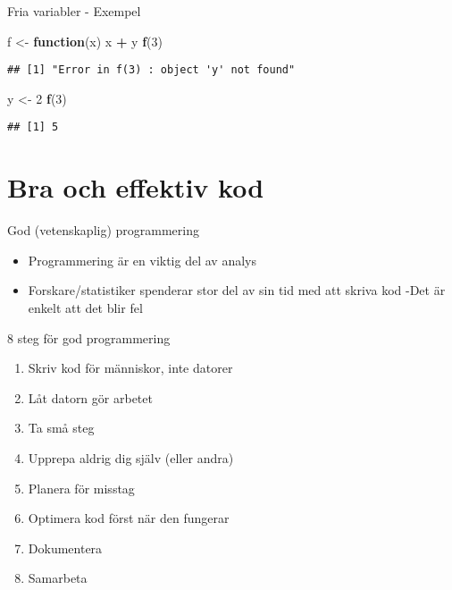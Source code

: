 \documentclass[
  11pt,
  ignorenonframetext,
]{beamer}
\newenvironment{Shaded}{\begin{snugshade}}{\end{snugshade}}
\newcommand{\ControlFlowTok}[1]{\textcolor[rgb]{0.13,0.29,0.53}{\textbf{#1}}}
\newcommand{\DecValTok}[1]{\textcolor[rgb]{0.00,0.00,0.81}{#1}}
\newcommand{\FunctionTok}[1]{\textcolor[rgb]{0.13,0.29,0.53}{\textbf{#1}}}
\newcommand{\NormalTok}[1]{#1}
\newcommand{\OtherTok}[1]{\textcolor[rgb]{0.56,0.35,0.01}{#1}}
\newcommand{\SpecialCharTok}[1]{\textcolor[rgb]{0.81,0.36,0.00}{\textbf{#1}}}
\providecommand{\tightlist}{%
  \setlength{\itemsep}{0pt}\setlength{\parskip}{0pt}}
\begin{document}
\begin{frame}[fragile]{Fria variabler - Exempel}
\label{fria-variabler---exempel}
\begin{Shaded}
\begin{Highlighting}[]
\NormalTok{f }\OtherTok{\textless{}{-}} \ControlFlowTok{function}\NormalTok{(x) x }\SpecialCharTok{+}\NormalTok{ y}
\FunctionTok{f}\NormalTok{(}\DecValTok{3}\NormalTok{)}
\end{Highlighting}
\end{Shaded}

\begin{verbatim}
## [1] "Error in f(3) : object 'y' not found"
\end{verbatim}

\begin{Shaded}
\begin{Highlighting}[]
\NormalTok{y }\OtherTok{\textless{}{-}} \DecValTok{2}
\FunctionTok{f}\NormalTok{(}\DecValTok{3}\NormalTok{)}
\end{Highlighting}
\end{Shaded}

\begin{verbatim}
## [1] 5
\end{verbatim}
\end{frame}

\section{Bra och effektiv kod}\label{bra-och-effektiv-kod}

\begin{frame}{God (vetenskaplig) programmering}
\label{god-vetenskaplig-programmering}
\begin{itemize}
\tightlist
\item
  Programmering är en viktig del av analys
\item
  Forskare/statistiker spenderar stor del av sin tid med att skriva kod
  -Det är enkelt att det blir fel
\end{itemize}
\end{frame}

\begin{frame}{8 steg för god programmering}
\label{steg-fuxf6r-god-programmering}
\begin{enumerate}
\tightlist
\item
  Skriv kod för människor, inte datorer
\item
  Låt datorn gör arbetet
\item
  Ta små steg
\item
  Upprepa aldrig dig själv (eller andra)
\item
  Planera för misstag
\item
  Optimera kod först när den fungerar
\item
  Dokumentera
\item
  Samarbeta
\end{enumerate}
\end{frame}
\end{document}
